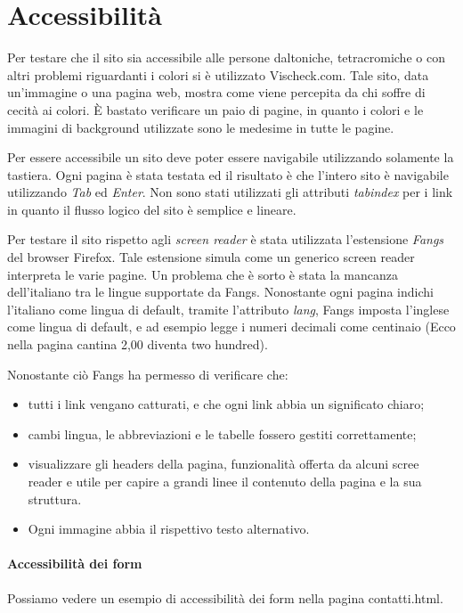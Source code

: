\section{Accessibilità}
Per testare che il sito sia accessibile alle persone daltoniche, tetracromiche o con altri problemi riguardanti i colori si è utilizzato Vischeck.com. Tale sito, data un'immagine o una pagina web, mostra come viene percepita da chi soffre di cecità ai colori. È bastato verificare un paio di pagine, in quanto i colori e le immagini di background utilizzate sono le medesime in tutte le pagine.

Per essere accessibile un sito deve poter essere navigabile utilizzando solamente la tastiera. 
Ogni pagina è stata testata ed il risultato è che l'intero sito è navigabile utilizzando \emph{Tab} ed \emph{Enter}.
Non sono stati utilizzati gli attributi \emph{tabindex} per i link in quanto il flusso logico del sito è semplice e lineare.

Per testare il sito rispetto agli \emph{screen reader} è stata utilizzata l'estensione \emph{Fangs} del browser Firefox.
Tale estensione simula come un generico screen reader interpreta le varie pagine. 
Un problema che è sorto è stata la mancanza dell'italiano tra le lingue supportate da Fangs. Nonostante ogni pagina indichi l'italiano come lingua di default, tramite l'attributo \emph{lang}, Fangs imposta l'inglese come lingua di default, e ad esempio legge i numeri decimali come centinaio (Ecco nella pagina cantina 2,00 diventa two hundred).

Nonostante ciò Fangs ha permesso di verificare che:
\begin{itemize}
\item tutti i link vengano catturati, e che ogni link abbia un significato chiaro;
\item cambi lingua, le abbreviazioni e le tabelle fossero gestiti correttamente;
\item visualizzare gli headers della pagina, funzionalità offerta da alcuni scree reader e utile per capire a grandi linee il contenuto della pagina e la sua struttura.
\item Ogni immagine abbia il rispettivo testo alternativo.
\end{itemize} 

\paragraph{Accessibilità dei form}

Possiamo vedere un esempio di accessibilità dei form nella pagina contatti.html.

